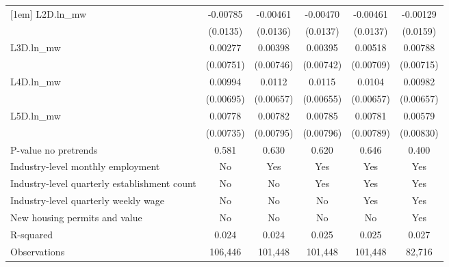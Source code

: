 {\begin{tabular}{l*{5}{c}}
[1em]
L2D.ln\_mw & -0.00785         & -0.00461         & -0.00470         & -0.00461         & -0.00129         \\
          & (0.0135)         & (0.0136)         & (0.0137)         & (0.0137)         & (0.0159)         \\
[1em]
L3D.ln\_mw &  0.00277         &  0.00398         &  0.00395         &  0.00518         &  0.00788         \\
          &(0.00751)         &(0.00746)         &(0.00742)         &(0.00709)         &(0.00715)         \\
[1em]
L4D.ln\_mw &  0.00994         &   0.0112\sym{*}  &   0.0115\sym{*}  &   0.0104         &  0.00982         \\
          &(0.00695)         &(0.00657)         &(0.00655)         &(0.00657)         &(0.00657)         \\
[1em]
L5D.ln\_mw &  0.00778         &  0.00782         &  0.00785         &  0.00781         &  0.00579         \\
          &(0.00735)         &(0.00795)         &(0.00796)         &(0.00789)         &(0.00830)         \\
\hline
P-value no pretrends&    0.581         &    0.630         &    0.620         &    0.646         &    0.400         \\
Industry-level monthly employment&       No         &      Yes         &      Yes         &      Yes         &      Yes         \\
Industry-level quarterly establishment count&       No         &       No         &      Yes         &      Yes         &      Yes         \\
Industry-level quarterly weekly wage&       No         &       No         &       No         &      Yes         &      Yes         \\
New housing permits and value&       No         &       No         &       No         &       No         &      Yes         \\
R-squared &    0.024         &    0.024         &    0.025         &    0.025         &    0.027         \\
Observations&  106,446         &  101,448         &  101,448         &  101,448         &   82,716         \\
\hline\hline
\end{tabular}
}
